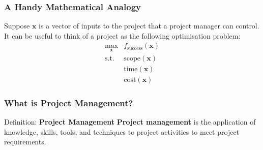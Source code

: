 \documentclass[aspectratio=169]{beamer}
\begin{document}
\begin{frame}
\frametitle{A Handy Mathematical Analogy}
Suppose $\textbf{x}$ is a vector of inputs to the project that a project manager can control. It can be useful to think of a project as the following optimisation problem:
\begin{equation*}
\begin{matrix}
\displaystyle \max_{\textbf{x}} & f_{\textrm{success}}(\textbf{x})  \\
\textrm{s.t.} & \textrm{scope}(\textbf{x}) \\
& \textrm{time}(\textbf{x}) \\
& \textrm{cost}(\textbf{x})
\end{matrix}
\end{equation*}
\end{frame}

\begin{frame}
\frametitle{What is Project Management?}
\begin{block}{Definition: \textbf{Project Management}}
\textbf{Project management} is the application of knowledge, skills, tools, and techniques to project activities to meet project requirements.
\end{block}
\end{frame}
\end{document}
